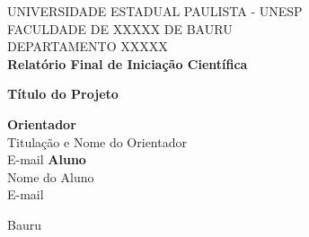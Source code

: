 \begin{titlepage}

\begin{center}
    {\large \sc UNIVERSIDADE ESTADUAL PAULISTA - UNESP} \\
    {\large \sc FACULDADE DE XXXXX DE BAURU}\\[0.7cm]
    {\small \sc DEPARTAMENTO XXXXX}\\[2.8cm]
    
    {\bf \large Relatório Final de Iniciação Científica}  
    
    \vspace{3cm}
    
    {\bf \large Título do Projeto}
    
    \vspace{4cm}
    
    \vfill
        {\large  \bf Orientador} \\ 
        {\large Titulação e Nome do Orientador} \\ 
        {\large E-mail} 
    \vfill
        {\large  \bf Aluno} \\
        {\large Nome do Aluno} \\
        {\large E-mail} 
        
    \vfill
    
     \begin{center}
        \makeatletter
        Bauru \\
        \@date
        \makeatother
    \end{center}
\end{center}
\pagebreak
\end{titlepage}

